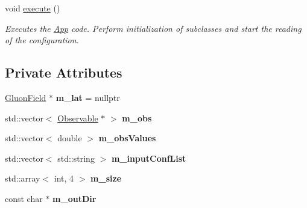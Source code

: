 \begin{DoxyCompactItemize}
\item 
void \hyperlink{classGaugeFieldReader_af410d62a4f0e146db40111d5be672264}{execute} ()\hypertarget{classGaugeFieldReader_af410d62a4f0e146db40111d5be672264}{}\label{classGaugeFieldReader_af410d62a4f0e146db40111d5be672264}

\begin{DoxyCompactList}\small\item\em Executes the \hyperlink{classApp}{App} code. Perform initialization of subclasses and start the reading of the configuration. \end{DoxyCompactList}\end{DoxyCompactItemize}
\subsection*{Private Attributes}
\begin{DoxyCompactItemize}
\item 
\hyperlink{field_8h_afe80b127697eba6d6e7fbd8121c8d4ee}{Gluon\+Field} $\ast$ {\bfseries m\+\_\+lat} = nullptr\hypertarget{classGaugeFieldReader_a5463d397d298c410b7a22d5f5b4a479e}{}\label{classGaugeFieldReader_a5463d397d298c410b7a22d5f5b4a479e}

\item 
std\+::vector$<$ \hyperlink{classObservable}{Observable} $\ast$ $>$ {\bfseries m\+\_\+obs}\hypertarget{classGaugeFieldReader_a754535c031598fef45833888e9979fe1}{}\label{classGaugeFieldReader_a754535c031598fef45833888e9979fe1}

\item 
std\+::vector$<$ double $>$ {\bfseries m\+\_\+obs\+Values}\hypertarget{classGaugeFieldReader_aeda178d621e12f56a9c377385bb1be0e}{}\label{classGaugeFieldReader_aeda178d621e12f56a9c377385bb1be0e}

\item 
std\+::vector$<$ std\+::string $>$ {\bfseries m\+\_\+input\+Conf\+List}\hypertarget{classGaugeFieldReader_a92c2a16c7ea8d99a156f8bf721cbd3cf}{}\label{classGaugeFieldReader_a92c2a16c7ea8d99a156f8bf721cbd3cf}

\item 
std\+::array$<$ int, 4 $>$ {\bfseries m\+\_\+size}\hypertarget{classGaugeFieldReader_ae82df049657776beb85fc3bbb36dad4e}{}\label{classGaugeFieldReader_ae82df049657776beb85fc3bbb36dad4e}

\item 
const char $\ast$ {\bfseries m\+\_\+out\+Dir}\hypertarget{classGaugeFieldReader_a2094749f83fd803ccc01e477aaa482e7}{}\label{classGaugeFieldReader_a2094749f83fd803ccc01e477aaa482e7}

\end{DoxyCompactItemize}
